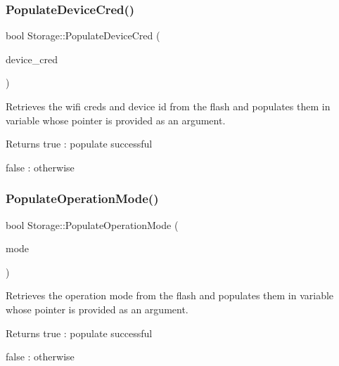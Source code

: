 \subsubsection{\texorpdfstring{Populate\+Device\+Cred()}{PopulateDeviceCred()}}
{\footnotesize\ttfamily bool Storage\+::\+Populate\+Device\+Cred (\begin{DoxyParamCaption}\item[{\hyperlink{structCONFIG__SET_1_1DEVICE__CRED}{C\+O\+N\+F\+I\+G\+\_\+\+S\+E\+T\+::\+D\+E\+V\+I\+C\+E\+\_\+\+C\+R\+ED} $\ast$}]{device\+\_\+cred }\end{DoxyParamCaption})}



Retrieves the wifi creds and device id from the flash and populates them in variable whose pointer is provided as an argument. 

\begin{DoxyReturn}{Returns}
true \+: populate successful 

false \+: otherwise 
\end{DoxyReturn}
\mbox{\label{classStorage_adc744139f574c6b1f28c7e29756b0591}} 
\subsubsection{\texorpdfstring{Populate\+Operation\+Mode()}{PopulateOperationMode()}}
{\footnotesize\ttfamily bool Storage\+::\+Populate\+Operation\+Mode (\begin{DoxyParamCaption}\item[{\hyperlink{namespaceCONFIG__SET_ac5c2592b79bead7e6497c37cddc401e6}{C\+O\+N\+F\+I\+G\+\_\+\+S\+E\+T\+::\+O\+P\+E\+R\+A\+T\+I\+O\+N\+\_\+\+M\+O\+DE} $\ast$}]{mode }\end{DoxyParamCaption})}



Retrieves the operation mode from the flash and populates them in variable whose pointer is provided as an argument. 

\begin{DoxyReturn}{Returns}
true \+: populate successful 

false \+: otherwise 
\end{DoxyReturn}
\mbox{\label{classStorage_a93011e30e7b8371f711f73f40c585026}} 
